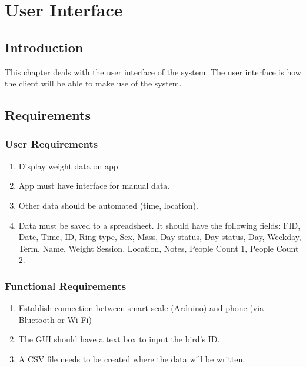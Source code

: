 \documentclass[class=report,11pt,crop=false]{standalone}
\begin{document}
	\chapter{User Interface \label{ch:user-interface}}
	
	\vspace{0.5cm}
	
	\section{Introduction}
	This chapter deals with the user interface of the system. The user interface is how the client will be able to make use of the system.
	
	\section{Requirements}
	
		\subsection{User Requirements}
		\begin{enumerate}
			\item Display weight data on app.
			\item App must have interface for manual data.
			\item Other data should be automated (time, location).
			\item Data must be saved to a spreadsheet. It should have the following fields: FID, Date, Time, ID, Ring type, Sex, Mass, Day status, Day status, Day, Weekday, Term, Name, Weight Session, Location, Notes, People Count 1, People Count 2.
			
		\end{enumerate}
		
		\subsection{Functional Requirements}
		\begin{enumerate}
			\item Establish connection between smart scale (Arduino) and phone (via Bluetooth or Wi-Fi) 
			\item The GUI should have a text box to input the bird's ID.
			\item A CSV file needs to be created where the data will be written.
		\end{enumerate}
			
\end{document}
